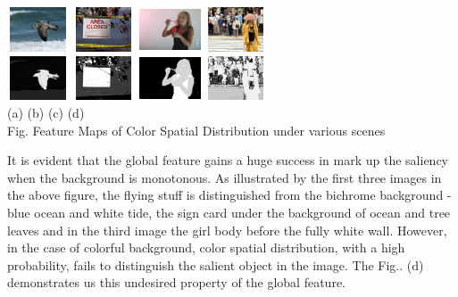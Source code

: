 \documentclass[10pt,twocolumn,letterpaper]{article}
\newcommand{\hs}{\hspace{0.58in}}
\begin{document}
    \begin{center}
    \includegraphics[width=0.72in,height=0.52in]{./CSD_image/1.jpg}
    \includegraphics[width=0.72in,height=0.52in]{./CSD_image/2.jpg}
    \includegraphics[width=0.72in,height=0.52in]{./CSD_image/3.jpg}
    \includegraphics[width=0.72in,height=0.52in]{./CSD_image/4.jpg}\\
    \includegraphics[width=0.72in,height=0.52in]{./CSD_image/1_CSD.jpg}
    \includegraphics[width=0.72in,height=0.52in]{./CSD_image/2_CSD.jpg}
    \includegraphics[width=0.72in,height=0.52in]{./CSD_image/3_CSD.jpg} 
    \includegraphics[width=0.72in,height=0.52in]{./CSD_image/4_CSD.jpg} \\
    \footnotesize \hspace{0.1cm} (a) \hs (b) \hs  (c) \hs (d) \\
     Fig. Feature Maps of Color Spatial Distribution under various scenes
    \end{center}

    It is evident that the global feature gains a huge success in mark up the saliency when the background
    is monotonous. As illustrated by the first three images in the above figure, the flying stuff
    is distinguished from the bichrome background - blue ocean and white tide, the sign card under the 
    background of ocean and tree leaves and in the third image the girl body before the fully white wall.
    However, in the case of colorful background, color spatial distribution, with a high probability,
    fails to distinguish the salient object in the image. The Fig.. (d) demonstrates us
    this undesired property of the global feature. 
\end{document}
